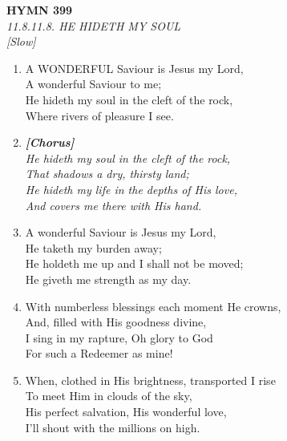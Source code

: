 \documentclass[11pt,a4paper]{article}
\begin{document}
\newpage
\begin{center}
    {\Large \textbf{HYMN 399}}
    \\
    \textit{11.8.11.8. HE HIDETH MY SOUL}
    \\
    \textit{\small [Slow]}
\end{center}
\vspace{1em}

\begin{enumerate}
    \item A WONDERFUL Saviour is Jesus my Lord, \\
        A wonderful Saviour to me; \\
        He hideth my soul in the cleft of the rock, \\
        Where rivers of pleasure I see.

    \item[] \vspace{0.4em}
    \textbf{\textit{[Chorus]}} \\
    \textit{He hideth my soul in the cleft of the rock,} \\
    \textit{That shadows a dry, thirsty land;} \\
    \textit{He hideth my life in the depths of His love,} \\
    \textit{And covers me there with His hand.}
    \vspace{0.4em}

    \item A wonderful Saviour is Jesus my Lord, \\
        He taketh my burden away; \\
        He holdeth me up and I shall not be moved; \\
        He giveth me strength as my day.

    \item With numberless blessings each moment He crowns, \\
        And, filled with His goodness divine, \\
        I sing in my rapture, Oh glory to God \\
        For such a Redeemer as mine!

    \item When, clothed in His brightness, transported I rise \\
        To meet Him in clouds of the sky, \\
        His perfect salvation, His wonderful love, \\
        I'll shout with the millions on high.

\end{enumerate}
\end{document}
